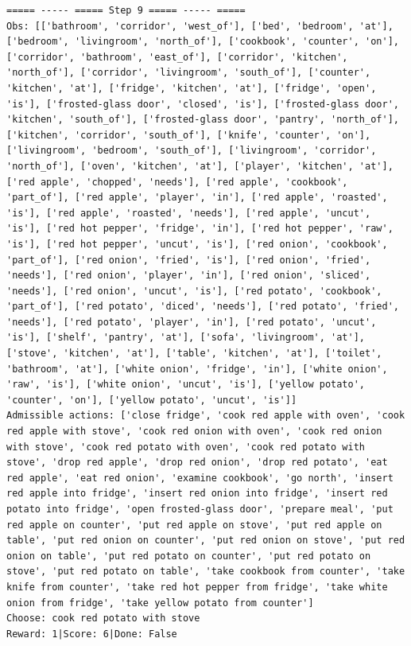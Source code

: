 \documentclass[11pt]{article}
\begin{document}
\begin{lstlisting}
===== ----- ===== Step 9 ===== ----- =====
Obs: [['bathroom', 'corridor', 'west_of'], ['bed', 'bedroom', 'at'], ['bedroom', 'livingroom', 'north_of'], ['cookbook', 'counter', 'on'], ['corridor', 'bathroom', 'east_of'], ['corridor', 'kitchen', 'north_of'], ['corridor', 'livingroom', 'south_of'], ['counter', 'kitchen', 'at'], ['fridge', 'kitchen', 'at'], ['fridge', 'open', 'is'], ['frosted-glass door', 'closed', 'is'], ['frosted-glass door', 'kitchen', 'south_of'], ['frosted-glass door', 'pantry', 'north_of'], ['kitchen', 'corridor', 'south_of'], ['knife', 'counter', 'on'], ['livingroom', 'bedroom', 'south_of'], ['livingroom', 'corridor', 'north_of'], ['oven', 'kitchen', 'at'], ['player', 'kitchen', 'at'], ['red apple', 'chopped', 'needs'], ['red apple', 'cookbook', 'part_of'], ['red apple', 'player', 'in'], ['red apple', 'roasted', 'is'], ['red apple', 'roasted', 'needs'], ['red apple', 'uncut', 'is'], ['red hot pepper', 'fridge', 'in'], ['red hot pepper', 'raw', 'is'], ['red hot pepper', 'uncut', 'is'], ['red onion', 'cookbook', 'part_of'], ['red onion', 'fried', 'is'], ['red onion', 'fried', 'needs'], ['red onion', 'player', 'in'], ['red onion', 'sliced', 'needs'], ['red onion', 'uncut', 'is'], ['red potato', 'cookbook', 'part_of'], ['red potato', 'diced', 'needs'], ['red potato', 'fried', 'needs'], ['red potato', 'player', 'in'], ['red potato', 'uncut', 'is'], ['shelf', 'pantry', 'at'], ['sofa', 'livingroom', 'at'], ['stove', 'kitchen', 'at'], ['table', 'kitchen', 'at'], ['toilet', 'bathroom', 'at'], ['white onion', 'fridge', 'in'], ['white onion', 'raw', 'is'], ['white onion', 'uncut', 'is'], ['yellow potato', 'counter', 'on'], ['yellow potato', 'uncut', 'is']]
Admissible actions: ['close fridge', 'cook red apple with oven', 'cook red apple with stove', 'cook red onion with oven', 'cook red onion with stove', 'cook red potato with oven', 'cook red potato with stove', 'drop red apple', 'drop red onion', 'drop red potato', 'eat red apple', 'eat red onion', 'examine cookbook', 'go north', 'insert red apple into fridge', 'insert red onion into fridge', 'insert red potato into fridge', 'open frosted-glass door', 'prepare meal', 'put red apple on counter', 'put red apple on stove', 'put red apple on table', 'put red onion on counter', 'put red onion on stove', 'put red onion on table', 'put red potato on counter', 'put red potato on stove', 'put red potato on table', 'take cookbook from counter', 'take knife from counter', 'take red hot pepper from fridge', 'take white onion from fridge', 'take yellow potato from counter']
Choose: cook red potato with stove
Reward: 1|Score: 6|Done: False


\end{lstlisting}
\end{document}
